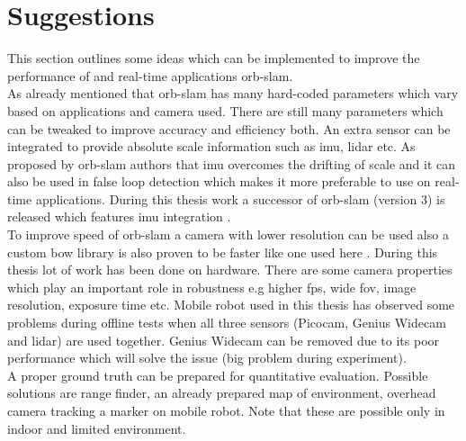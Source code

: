 \section{Suggestions}
This section outlines some ideas which can be implemented to improve the performance of and real-time applications \acrshort{orb}-\acrshort{slam}.\\
\newline As already mentioned that \acrshort{orb}-\acrshort{slam} has many hard-coded parameters which vary based on applications and camera used. There are still many parameters which can be tweaked to improve accuracy and efficiency both. An extra sensor can be integrated to provide absolute scale information such as \acrshort{imu}, \acrshort{lidar} etc. As proposed by \acrshort{orb}-\acrshort{slam} authors \cite{orbslam} that \acrshort{imu} overcomes the drifting of scale and it can also be used in false loop detection which makes it more preferable to use on real-time applications. During this thesis work a successor of \acrshort{orb}-\acrshort{slam} (version 3) is released which features \acrshort{imu} integration \cite{ORBSLAM3}. \\
\newline To improve speed of \acrshort{orb}-\acrshort{slam} a camera with lower resolution can be used also a custom \acrshort{bow} library is also proven to be faster like one used here \cite{Fbow}. During this thesis lot of work has been done on hardware. There are some camera properties which play an important role in robustness e.g higher \acrshort{fps}, wide \acrshort{fov}, image resolution, exposure time etc. Mobile robot used in this thesis has observed some problems during offline tests when all three sensors (Picocam, Genius Widecam and \acrshort{lidar}) are used together. Genius Widecam can be removed due to its poor performance which will solve the issue (big problem during experiment). \\
\newline A proper ground truth can be prepared for quantitative evaluation. Possible solutions are range finder, an already prepared map of environment, overhead camera tracking a marker on mobile robot. Note that these are possible only in indoor and limited environment.  
